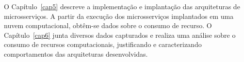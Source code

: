 O Capítulo~\ref{cap5} descreve a implementação e implantação das arquiteturas de microsserviços.
%
A partir da execução dos microsserviços implantados em uma nuvem computacional, obtêm-se dados sobre o consumo de recurso.
%
O Capítulo~\ref{cap6} junta diversos dados capturados e realiza uma análise sobre o consumo de recursos computacionais, justificando e caracterizando comportamentos das arquiteturas desenvolvidas.
